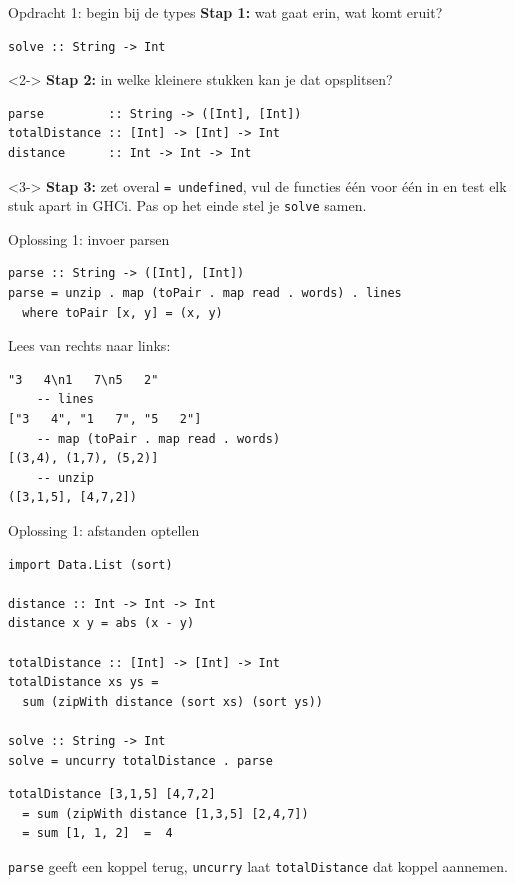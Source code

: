 \documentclass[aspectratio=169,11pt]{beamer}
\newcommand{\hs}{\lstinline[style=hsinline]}
\begin{document}
\begin{frame}[fragile]{Opdracht 1: begin bij de types}
  \textbf{Stap 1:} wat gaat erin, wat komt eruit?
\begin{lstlisting}
solve :: String -> Int
\end{lstlisting}
  \begin{uncoverenv}<2->
  \textbf{Stap 2:} in welke kleinere stukken kan je dat opsplitsen?
\begin{lstlisting}
parse         :: String -> ([Int], [Int])
totalDistance :: [Int] -> [Int] -> Int
distance      :: Int -> Int -> Int
\end{lstlisting}
  \end{uncoverenv}
  \begin{uncoverenv}<3->
  \textbf{Stap 3:} zet overal \hs|= undefined|, vul de functies één voor één in
  en test elk stuk apart in GHCi. Pas op het einde stel je \hs|solve| samen.
  \end{uncoverenv}
\end{frame}
 
\begin{frame}[fragile]{Oplossing 1: invoer parsen}
\begin{lstlisting}
parse :: String -> ([Int], [Int])
parse = unzip . map (toPair . map read . words) . lines
  where toPair [x, y] = (x, y)
\end{lstlisting}
  \pause
  Lees van \alert{rechts naar links}:
\begin{lstlisting}
"3   4\n1   7\n5   2"
    -- lines
["3   4", "1   7", "5   2"]
    -- map (toPair . map read . words)
[(3,4), (1,7), (5,2)]
    -- unzip
([3,1,5], [4,7,2])
\end{lstlisting}
\end{frame}

\begin{frame}[fragile]{Oplossing 1: afstanden optellen}
\begin{lstlisting}
import Data.List (sort)

distance :: Int -> Int -> Int
distance x y = abs (x - y)

totalDistance :: [Int] -> [Int] -> Int
totalDistance xs ys =
  sum (zipWith distance (sort xs) (sort ys))

solve :: String -> Int
solve = uncurry totalDistance . parse
\end{lstlisting}
  \pause
\begin{lstlisting}
totalDistance [3,1,5] [4,7,2]
  = sum (zipWith distance [1,3,5] [2,4,7])
  = sum [1, 1, 2]  =  4
\end{lstlisting}
  \hs|parse| geeft een koppel terug, \hs|uncurry| laat \hs|totalDistance| dat koppel aannemen.
\end{frame}
\end{document}
